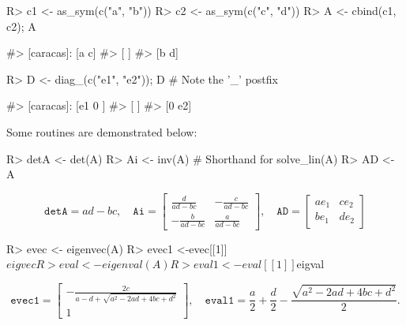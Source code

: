 \begin{Schunk}
\begin{Sinput}
R> c1 <- as_sym(c("a", "b"))
R> c2 <- as_sym(c("c", "d"))
R> A <- cbind(c1, c2); A
\end{Sinput}
\begin{Soutput}
#> [caracas]: [a  c]
#>            [    ]
#>            [b  d]
\end{Soutput}
\begin{Sinput}
R> D <- diag_(c("e1", "e2")); D # Note the '_' postfix
\end{Sinput}
\begin{Soutput}
#> [caracas]: [e1  0 ]
#>            [      ]
#>            [0   e2]
\end{Soutput}
\end{Schunk}

Some routines are demonstrated below:

\begin{Schunk}
\begin{Sinput}
R> detA <- det(A)
R> Ai <- inv(A) # Shorthand for solve_lin(A)
R> AD <- A %
\end{Sinput}
\end{Schunk}

\[
\texttt{detA} = a d - b c, \quad
\texttt{Ai} = \left[\begin{matrix}\frac{d}{a d - b c} & - \frac{c}{a d - b c}\\- \frac{b}{a d - b c} & \frac{a}{a d - b c}\end{matrix}\right], \quad
\texttt{AD} = \left[\begin{matrix}a e_{1} & c e_{2}\\b e_{1} & d e_{2}\end{matrix}\right]
\]

\begin{Schunk}
\begin{Sinput}
R> evec <- eigenvec(A)
R> evec1 <-evec[[1]]$eigvec %
R> eval <- eigenval(A)
R> eval1 <- eval[[1]]$eigval %
\end{Sinput}
\end{Schunk}

\[
\texttt{evec1} = \left[\begin{matrix}- \frac{2 c}{a - d + \sqrt{a^{2} - 2 a d + 4 b c + d^{2}}}\\1\end{matrix}\right], \quad
\texttt{eval1} = \frac{a}{2} + \frac{d}{2} - \frac{\sqrt{a^{2} - 2 a d + 4 b c + d^{2}}}{2}.
\]

